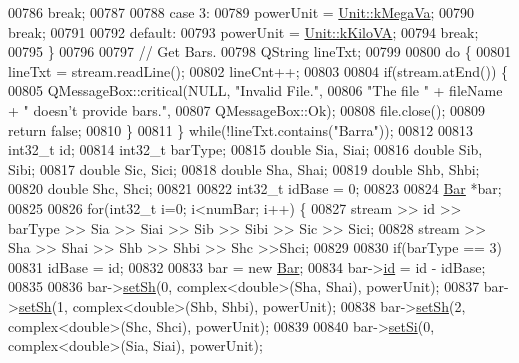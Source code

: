 \begin{DoxyCode}
00786     \textcolor{keywordflow}{break};
00787 
00788   \textcolor{keywordflow}{case} 3:
00789     powerUnit = \hyperlink{class_unit_ace265ae255370ccacfd5370337572c3ba6039da0ed20f8bee64305bab8bdec365}{Unit::kMegaVa};
00790     \textcolor{keywordflow}{break};
00791 
00792   \textcolor{keywordflow}{default}:
00793     powerUnit = \hyperlink{class_unit_ace265ae255370ccacfd5370337572c3bac9e5154522fbb810d7aed75c3ff47cb2}{Unit::kKiloVA};
00794     \textcolor{keywordflow}{break};
00795   \}
00796 
00797   \textcolor{comment}{// Get Bars.}
00798   QString lineTxt;
00799 
00800   \textcolor{keywordflow}{do} \{
00801     lineTxt = stream.readLine();
00802     lineCnt++;
00803 
00804     \textcolor{keywordflow}{if}(stream.atEnd()) \{
00805       QMessageBox::critical(NULL, \textcolor{stringliteral}{"Invalid File."},
00806                             \textcolor{stringliteral}{"The file "} + fileName + \textcolor{stringliteral}{" doesn't provide bars."},
00807                             QMessageBox::Ok);
00808       file.close();
00809       \textcolor{keywordflow}{return} \textcolor{keyword}{false};
00810     \}
00811   \} \textcolor{keywordflow}{while}(!lineTxt.contains(\textcolor{stringliteral}{"Barra"}));
00812 
00813   int32\_t id;
00814   int32\_t barType;
00815   \textcolor{keywordtype}{double} Sia, Siai;
00816   \textcolor{keywordtype}{double} Sib, Sibi;
00817   \textcolor{keywordtype}{double} Sic, Sici;
00818   \textcolor{keywordtype}{double} Sha, Shai;
00819   \textcolor{keywordtype}{double} Shb, Shbi;
00820   \textcolor{keywordtype}{double} Shc, Shci;
00821 
00822   int32\_t idBase = 0;
00823 
00824   \hyperlink{class_bar}{Bar} *bar;
00825 
00826   \textcolor{keywordflow}{for}(int32\_t i=0; i<numBar; i++) \{
00827     stream >> \textcolor{keywordtype}{id} >> barType >> Sia >> Siai >> Sib >> Sibi >> Sic >> Sici;
00828     stream >> Sha >> Shai >> Shb >> Shbi >> Shc >>Shci;
00829 
00830     \textcolor{keywordflow}{if}(barType == 3)
00831       idBase = id;
00832 
00833     bar = \textcolor{keyword}{new} \hyperlink{class_bar}{Bar};
00834     bar->\hyperlink{class_bar_a9dc5c6a6d44fe412ae34ef8a881b8dce}{id} = \textcolor{keywordtype}{id} - idBase;
00835 
00836     bar->\hyperlink{group___models_ga207abd3d0649a488e3c44cf2a501ed23}{setSh}(0, complex<double>(Sha, Shai), powerUnit);
00837     bar->\hyperlink{group___models_ga207abd3d0649a488e3c44cf2a501ed23}{setSh}(1, complex<double>(Shb, Shbi), powerUnit);
00838     bar->\hyperlink{group___models_ga207abd3d0649a488e3c44cf2a501ed23}{setSh}(2, complex<double>(Shc, Shci), powerUnit);
00839 
00840     bar->\hyperlink{group___models_ga74e510be49e50e4c14550b32e1dc92f9}{setSi}(0, complex<double>(Sia, Siai), powerUnit);

\end{DoxyCode}
